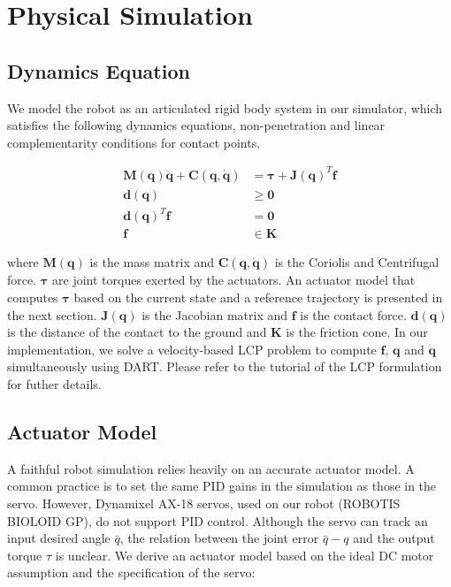 \section{Physical Simulation}

\subsection{Dynamics Equation}

We model the robot as an articulated rigid body system in our simulator, which satisfies the following dynamics equations, non-penetration and linear complementarity conditions for contact points.

\begin{align}
\label{eq:robotdynamics}
\mathbf{M}(\mathbf{q})\mathbf{\ddot{q}}+\mathbf{C}(\mathbf{q},\mathbf{\dot{q}})&=\boldsymbol{\tau}+\mathbf{J}(\mathbf{q})^T\mathbf{f}\\
\nonumber \mathbf{d}(\mathbf{q})&\geq \mathbf{0}\\
\nonumber \mathbf{d}(\mathbf{q})^T\mathbf{f}&= \mathbf{0}\\
\nonumber \mathbf{f}&\in\mathbf{K}
\nonumber \end{align}

where $\mathbf{M}(\mathbf{q})$ is the mass matrix and $\mathbf{C}(\mathbf{q},\mathbf{\dot{q}})$ is the Coriolis and Centrifugal force. $\boldsymbol{\tau}$ are joint torques exerted by the actuators. An actuator model that computes $\boldsymbol{\tau}$ based on the current state and a reference trajectory is presented in the next section. $\mathbf{J}(\mathbf{q})$ is the Jacobian matrix and $\mathbf{f}$ is the contact force. $\mathbf{d}(\mathbf{q})$ is the distance of the contact to the ground and $\mathbf{K}$ is the friction cone. In our implementation, we solve a velocity-based LCP problem to compute $\mathbf{f}$, $\mathbf{q}$ and $\dot{\mathbf{q}}$ simultaneously using DART. Please refer to the tutorial of the LCP formulation \cite{Tan:2012b} for futher details.

\subsection{Actuator Model}
\label{sec:motorDynamics}
A faithful robot simulation relies heavily on an accurate actuator model. A common practice is to set the same PID gains in the simulation as those in the servo. However, Dynamixel AX-18 servos, used on our robot (ROBOTIS BIOLOID GP), do not support PID control. Although the servo can track an input desired angle $\bar{q}$, the relation between the joint error $\bar{q}-q$ and the output torque $\tau$ is unclear. We derive an actuator model based on the ideal DC motor assumption and the specification of the servo:

